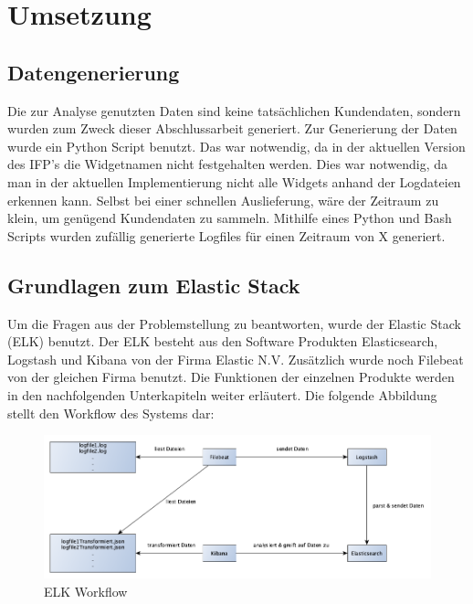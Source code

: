 \section{Umsetzung}
\label{sec:Umsetzung}

\subsection{Datengenerierung}
\label{sub:Datengenerierung}

Die zur Analyse genutzten Daten sind keine tatsächlichen Kundendaten, sondern wurden zum Zweck dieser Abschlussarbeit generiert.
Zur Generierung der Daten wurde ein Python Script benutzt. Das war notwendig, da in der aktuellen Version des IFP's die Widgetnamen nicht festgehalten werden. Dies war notwendig, da man in der aktuellen Implementierung nicht alle Widgets anhand der Logdateien erkennen kann. Selbst bei einer schnellen Auslieferung, wäre der Zeitraum zu klein, um genügend Kundendaten zu sammeln. Mithilfe eines Python und Bash Scripts wurden zufällig generierte Logfiles für einen Zeitraum von X generiert. 

\subsection{Grundlagen zum Elastic Stack}
\label{sub:Grundlagen zum Elastic Stack}
Um die Fragen aus der Problemstellung zu beantworten, wurde der Elastic Stack (ELK) benutzt. Der ELK besteht aus den Software Produkten Elasticsearch, Logstash und Kibana von der Firma Elastic N.V. Zusätzlich wurde noch Filebeat von der gleichen Firma benutzt. Die Funktionen der einzelnen Produkte werden in den nachfolgenden Unterkapiteln weiter erläutert. Die folgende Abbildung stellt den Workflow des Systems dar:

\begin{figure}[htb]
\begin{center}
	\includegraphics[width=430pt]{bilder/workflow.png}
\end{center}
\caption{ELK Workflow}
\label{fig:elk_workflow}
\end{figure}



